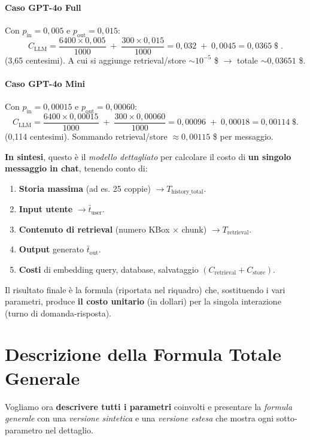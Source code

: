 \documentclass{article}
\begin{document}
\paragraph{Caso GPT-4o Full}
Con $p_{\text{in}}=0,005$ e $p_{\text{out}}=0,015$:
\[
C_{\text{LLM}}
= \frac{6400 \times 0{,}005}{1000}
\;+\;
\frac{300 \times 0{,}015}{1000}
= 0{,}032 \;+\; 0{,}0045
= 0{,}0365\;\$\;.
\]
(3,65 centesimi). A cui si aggiunge retrieval/store $\sim 10^{-5}$ \$ $\rightarrow$ totale $\sim 0{,}03651$ \$.

\paragraph{Caso GPT-4o Mini}
Con $p_{\text{in}}=0,00015$ e $p_{\text{out}}=0,00060$:
\[
C_{\text{LLM}}
= \frac{6400 \times 0{,}00015}{1000}
\;+\;
\frac{300 \times 0{,}00060}{1000}
= 0{,}00096 \;+\; 0{,}00018
= 0{,}00114\;\$.
\]
(0,114 centesimi). Sommando retrieval/store $\approx 0{,}00115$ \$ per messaggio.

\medskip
\textbf{In sintesi}, questo è il \emph{modello dettagliato} per calcolare il costo di \textbf{un singolo messaggio in chat}, tenendo conto di:
\begin{enumerate}
    \item \textbf{Storia massima} (ad es. 25 coppie) $\rightarrow T_{\text{history\_total}}$.
    \item \textbf{Input utente} $\rightarrow \bar{t}_{\text{user}}$.
    \item \textbf{Contenuto di retrieval} (numero KBox $\times$ chunk) $\rightarrow T_{\text{retrieval}}$.
    \item \textbf{Output} generato $\bar{t}_{\text{out}}$.
    \item \textbf{Costi} di embedding query, database, salvataggio $(C_{\text{retrieval}} + C_{\text{store}})$.
\end{enumerate}
Il risultato finale è la formula (riportata nel riquadro) che, sostituendo i vari parametri, produce \textbf{il costo unitario} (in dollari) per la singola interazione (turno di domanda-risposta).

\bigskip

\section*{Descrizione della Formula Totale Generale}

Vogliamo ora \textbf{descrivere tutti i parametri} coinvolti e presentare la \emph{formula generale} con una \emph{versione sintetica} e una \emph{versione estesa} che mostra ogni sotto-parametro nel dettaglio.
\end{document}
